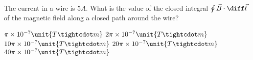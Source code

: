 \begin{questions}\setcounter{question}{6}\question
The current in a wire is $5 \unit{A}$. What is the value of the closed integral $\oint \vec{B} \cdot \diff \vec{\ell}$ of the magnetic field along a closed path around the wire?

\begin{choices}
\choice $   \pi \times 10^{-7} \unit{T \tightcdot m}$
\choice $2  \pi \times 10^{-7} \unit{T \tightcdot m}$
\choice $10 \pi \times 10^{-7} \unit{T \tightcdot m}$
\choice $20 \pi \times 10^{-7} \unit{T \tightcdot m}$
\choice $40 \pi \times 10^{-7} \unit{T \tightcdot m}$
\end{choices}\end{questions}

